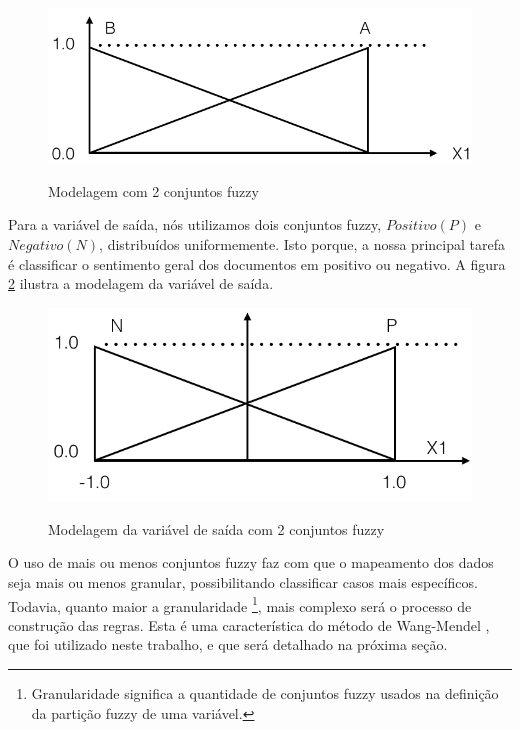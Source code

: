 \documentclass[template.tex]{subfiles}
\begin{document}
\begin{figure}[H]
\caption{Modelagem com 2 conjuntos fuzzy}
\centering
\includegraphics[scale=0.45]{conjuntos_fuzzy_entrada_final.png}
\label{figura:conjuntos_fuzzy_entrada_final}
\end{figure}

Para a variável de saída, nós utilizamos dois conjuntos fuzzy, $Positivo (P)$ e $Negativo (N)$, distribuídos uniformemente. Isto porque, a nossa principal tarefa é classificar o sentimento geral dos documentos em positivo ou negativo. A figura \ref{figura:conjuntos_fuzzy_saida} ilustra a modelagem da variável de saída.

\begin{figure}[H]
\caption{Modelagem da variável de saída com 2 conjuntos fuzzy}
\centering
\includegraphics[scale=0.45]{conjuntos_fuzzy_saida.png}
\label{figura:conjuntos_fuzzy_saida}
\end{figure}

O uso de mais ou menos conjuntos fuzzy faz com que o mapeamento dos dados seja mais ou menos granular, possibilitando classificar casos mais específicos. Todavia, quanto maior a granularidade  \footnote{Granularidade significa a quantidade de conjuntos fuzzy usados na definição da partição fuzzy de uma variável.}, mais complexo será o processo de construção das regras. Esta é uma característica do método de Wang-Mendel \cite{wang1992generating}, que foi utilizado neste trabalho, e que será detalhado na próxima seção.
\end{document}
